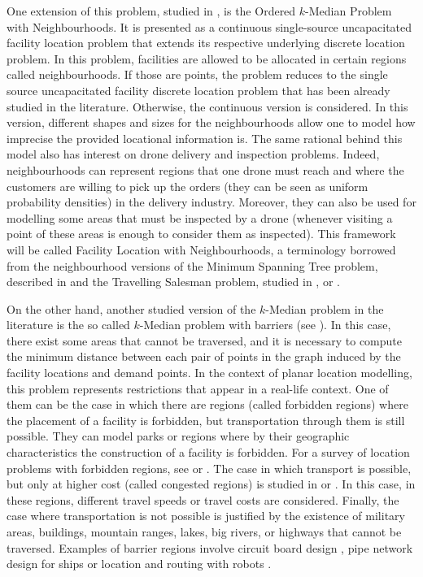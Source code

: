 \documentclass[a4paper,  review, authoryear, 1p.]{elsarticle}
\begin{document}
	One extension of this problem, studied in \cite{blanco2019}, is the Ordered $k$-Median Problem with Neighbourhoods. It is presented as a continuous single-source uncapacitated facility location problem that extends its respective underlying discrete location problem. In this problem, facilities are allowed to be allocated in certain regions called neighbourhoods. If those are points, the problem reduces to the single source uncapacitated facility discrete location problem that has been already studied in the literature. Otherwise, the continuous version is considered. In this version, different shapes and sizes for the neighbourhoods allow one to model how imprecise the provided locational information is. The same rational behind this model also has interest on drone delivery and inspection problems. Indeed, neighbourhoods can represent regions that one drone must reach and where the customers are willing to pick up the orders (they can be seen as uniform probability densities) in the delivery industry. Moreover, they can also be used for modelling some areas that must be inspected by a drone (whenever visiting a point of these areas is enough to consider them as inspected). This framework will be called Facility Location with Neighbourhoods, a terminology borrowed from the neighbourhood versions of the Minimum Spanning Tree problem, described in \citet{blanco2017} and the Travelling Salesman problem, studied in \citet{gentilini2013}, \citet{yuan2017} or \citet{puerto2022a}.
	
	On the other hand, another studied version of the $k$-Median problem in the literature is the so called $k$-Median problem with barriers (see \citet{klamroth2002}). In this case, there exist some areas that cannot be traversed, and it is necessary to compute the minimum distance between each pair of points in the graph induced by the facility locations and demand points. In the context of planar location modelling, this problem represents restrictions that appear in a real-life context. One of them can be the case in which there are regions (called forbidden regions) where the placement of a facility is forbidden, but transportation through them is still possible. They can model parks or regions where by their geographic characteristics the construction of a facility is forbidden. For a survey of location problems with forbidden regions, see \cite{hamacher1995} or \cite{nickel1995}. The case in which transport is possible, but only at higher cost (called congested regions) is studied in \cite{butt1996} or \cite{mitchell1991}. In this case, in these regions, different travel speeds or travel costs are considered. Finally, the case where transportation is not possible is justified by the existence of military areas, buildings, mountain ranges, lakes, big rivers, or highways that cannot be traversed. Examples of barrier regions involve circuit board design \citep{lapaugh1980}, pipe network design for ships \citep{wangdahl1974, blanco2022} or location and routing with robots \citep{lozano-perez1979}. 
	
\end{document}
